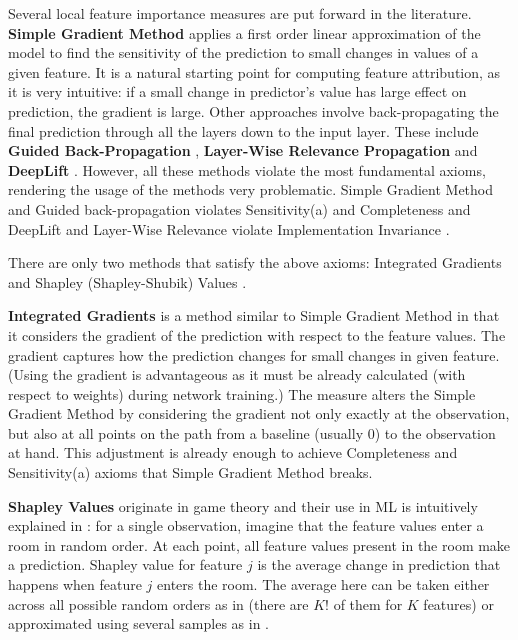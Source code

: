 {			Several local feature importance measures are put forward in the literature. \textbf{Simple Gradient Method} \citep{baehrens2010explain} applies a first order linear approximation of the model to find the sensitivity of the prediction to small changes in values of a given feature. It is a natural starting point for computing feature attribution, as it is very intuitive: if a small change in predictor's value has large effect on prediction, the gradient is large. Other approaches involve back-propagating the final prediction through all the layers down to the input layer. These include  \textbf{Guided Back-Propagation} \citep{springenberg2014striving}, \textbf{Layer-Wise Relevance Propagation} \citep{binder2016layer} and \textbf{DeepLift} \citep{shrikumar2017learning}. However, all these methods violate the most fundamental axioms, rendering the usage of the methods very problematic. Simple Gradient Method and Guided back-propagation violates Sensitivity(a) and Completeness and DeepLift and Layer-Wise Relevance violate Implementation Invariance \citep{shrikumar2017learning, sundararajan2017axiomatic}.
			
			There are only two methods that satisfy the above axioms: Integrated Gradients \citep{sundararajan2017axiomatic} and Shapley (Shapley-Shubik) Values \citep{shapley1971assignment}. 	
			
			\textbf{ Integrated Gradients} \citep{sundararajan2017axiomatic} is a method similar to Simple Gradient Method in that it considers the gradient of the prediction with respect to the feature values. The gradient captures how the prediction changes for small changes in given feature. (Using the gradient is advantageous as it must be already calculated (with respect to weights) during network training.) The measure alters the Simple Gradient Method by considering the gradient not only exactly at the observation, but also at all points on the path from a baseline (usually $0$) to the observation at hand. This adjustment is already enough to achieve Completeness and Sensitivity(a) axioms that Simple Gradient Method breaks. 
			
			\textbf{Shapley Values} originate in game theory and their use in ML is intuitively explained in \cite{molnar2020interpretable}: for a single observation, imagine that the feature values enter a room in random order. At each point, all feature values present in the room make a prediction. Shapley value for feature $j$ is the average change in prediction that happens when feature $j$ enters the room. The average here can be taken either across all possible random orders as in \cite{shapley1971assignment} (there are $K!$ of them for $K$ features) or approximated using several samples as in \cite{vstrumbelj2014explaining}. 
			
}
